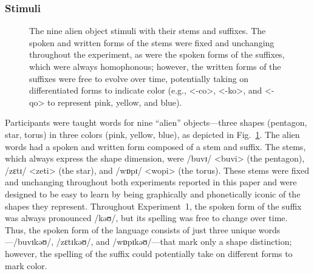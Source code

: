 \documentclass[doc,biblatex]{apa7}
\begin{document}
\subsubsection{Stimuli}

	\begin{figure}
	\vspace*{2pt}
	\caption{The nine alien object stimuli with their stems and suffixes. The spoken and written forms of the stems were fixed and unchanging throughout the experiment, as were the spoken forms of the suffixes, which were always homophonous; however, the written forms of the suffixes were free to evolve over time, potentially taking on differentiated forms to indicate color (e.g., <-co>, <-ko>, and <-qo> to represent pink, yellow, and blue).}
	\label{stimuli}
	\end{figure}

Participants were taught words for nine ``alien'' objects---three shapes (pentagon, star, torus) in three colors (pink, yellow, blue), as depicted in Fig.~\ref{stimuli}. The alien words had a spoken and written form composed of a stem and suffix. The stems, which always express the shape dimension, were /buvɪ/ <buvi> (the pentagon), /zɛtɪ/ <zeti> (the star), and /wɒpɪ/ <wopi> (the torus). These stems were fixed and unchanging throughout both experiments reported in this paper and were designed to be easy to learn by being graphically and phonetically iconic of the shapes they represent. Throughout Experiment~1, the spoken form of the suffix was always pronounced /kəʊ/, but its spelling was free to change over time. Thus, the spoken form of the language consists of just three unique words---/buvɪkəʊ/, /zɛtɪkəʊ/, and /wɒpɪkəʊ/---that mark only a shape distinction; however, the spelling of the suffix could potentially take on different forms to mark color.
\end{document}
